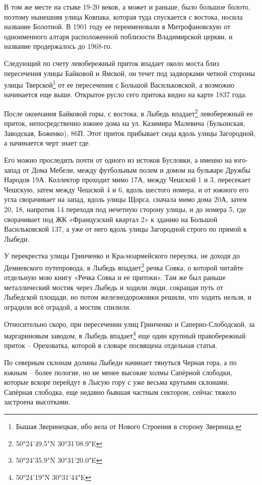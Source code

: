 В том же месте на стыке 19-20 веков, а может и раньше, было большое болото, поэтому нынешняя улица Ковпака, которая туда спускается с востока, носила название Болотной. В 1901 году ее переименовали в Митрофановскую от одноименного алтаря расположенной поблизости Владимирской церкви, и название продержалось до 1968-го.

Следующий по счету левобережный приток впадает около моста близ пересечения улицы Байковой и Ямской, он течет под задворками четной стороны улицы Тверской\footnote{Бышая Зверинецкая, ибо вела от Нового Строения в сторону Зверинца.} от ее пересечения с Большой Васильковской, а возможно начинается еще выше. Открытое русло сего притока видно на карте 1837 года.

После окончания Байковой горы, с востока, в Лыбедь впадает\footnote{50°24'49.5"N 30°31'08.9"E} левобережный ее приток, непосредственно южнее дома на ул. Казимира Малевича (Бульонская, Заводская, Боженко), 86П. Этот приток прибывает сюда вдоль улицы Загородной, а начинается черт знает где. 

Его можно проследить почти от одного из истоков Бусловки, а именно на юго-запад от Дома Мебели, между футбольным полем и домом на бульваре Дружбы Народов 19А. Коллектор проходит мимо 17А, между Чешской 1 и 3, пересекает Чешскую, затем между Чешской 4 и 6, вдоль шестого номера, и от южного его угла сворачивает на запад, вдоль улицы Щорса, сначала мимо дома 20А, затем 20, 18, напротив 14 переходя под нечетную сторону улицы, и до номера 5, где сворачивает под ЖК «Французский квартал 2» к зданию на Большой Васильковской 137, а уже от него вдоль улицы Загородной строго по прямой к Лыбеди.

У перекрестка улицы Гринченко и Краcноармейского переулка, не доходя до Демиевского путепровода, в Лыбедь впадает\footnote{50°24'35.9"N 30°31'20.0"E} речка Совка, о которой читайте отдельную мою книгу «Речка Совка и ее притоки». Там же был раньше металлический мостик через Лыбедь и ходили люди, сокращая путь от Лыбедской площади, но потом железнодорожники решили, что ходить нельзя, и оградили всё оградой, а мостик спилили.

Относительно скоро, при пересечении улиц Гринченко и Саперно-Сло\-бодской, за маргариновым заводом, в Лыбедь впадает\footnote{ 50°24'19"N 30°31'44"E} еще один крупный правобережный приток – Ореховатка, которой в словаре посвящена отдельная статья.

По северным склонам долины Лыбеди начинает тянуться Черная гора, а по южным – более пологие, но не менее высокие холмы Сапёрной слободки, которые вскоре перейдут в Лысую гору с уже весьма крутыми склонами. Сапёрная слободка, еще недавно бывшая частным сектором, сейчас тяжело застроена высотками.

